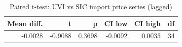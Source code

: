 \begin{table}

\caption{Paired t-test: UVI vs SIC import price series (lagged)}
\centering
\begin{tabular}[t]{rrrrrr}
\toprule
Mean diff. & t & p & CI low & CI high & df\\
\midrule
-0.0028 & -0.9088 & 0.3698 & -0.0092 & 0.0035 & 34\\
\bottomrule
\end{tabular}
\end{table}
